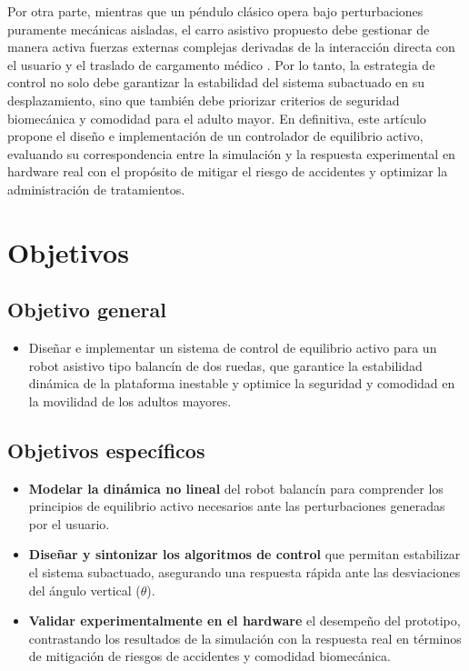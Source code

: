 \documentclass[conference]{IEEEtran}
\begin{document}
Por otra parte, mientras que un péndulo clásico opera bajo perturbaciones puramente mecánicas aisladas, el carro asistivo propuesto debe gestionar de manera activa fuerzas externas complejas derivadas de la interacción directa con el usuario y el traslado de cargamento médico \cite{robotic_cane2023}. Por lo tanto, la estrategia de control no solo debe garantizar la estabilidad del sistema subactuado en su desplazamiento, sino que también debe priorizar criterios de seguridad biomecánica y comodidad para el adulto mayor. En definitiva, este artículo propone el diseño e implementación de un controlador de equilibrio activo, evaluando su correspondencia entre la simulación y la respuesta experimental en hardware real con el propósito de mitigar el riesgo de accidentes y optimizar la administración de tratamientos.

\section{Objetivos}
\subsection{Objetivo general}
\begin{itemize}
    \item Diseñar e implementar un sistema de control de equilibrio activo para un robot asistivo tipo balancín de dos ruedas, que garantice la estabilidad dinámica de la plataforma inestable y optimice la seguridad y comodidad en la movilidad de los adultos mayores.
\end{itemize}

\subsection{Objetivos específicos}
\begin{itemize}
    \item \textbf{Modelar la dinámica no lineal} del robot balancín para comprender los principios de equilibrio activo necesarios ante las perturbaciones generadas por el usuario.
    \item \textbf{Diseñar y sintonizar los algoritmos de control} que permitan estabilizar el sistema subactuado, asegurando una respuesta rápida ante las desviaciones del ángulo vertical ($\theta$).
    \item \textbf{Validar experimentalmente en el hardware} el desempeño del prototipo, contrastando los resultados de la simulación con la respuesta real en términos de mitigación de riesgos de accidentes y comodidad biomecánica.
\end{itemize}
\end{document}
